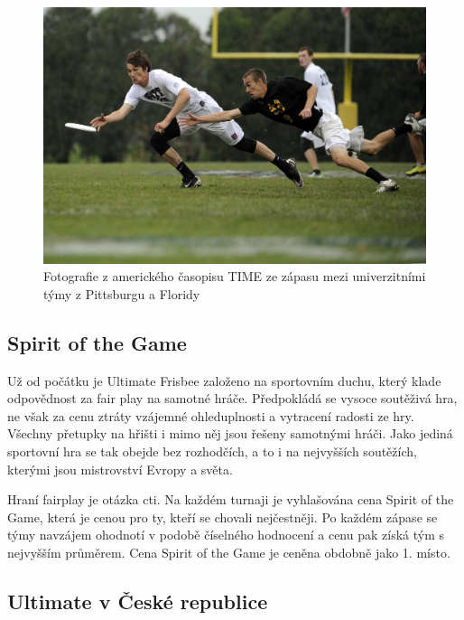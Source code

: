 \begin{figure}[ht!]
\centering
\includegraphics[width=130mm]{./images/ultimate-frisbee.jpg}
\caption{Fotografie z amerického časopisu TIME ze zápasu mezi univerzitními týmy z Pittsburgu a Floridy \cite{ultimate-time}\label{overflow}}
\end{figure}


\subsection{Spirit of the Game}

\indent

Už od počátku je Ultimate Frisbee založeno na sportovním duchu, který klade odpovědnost
za fair play na samotné hráče. Předpokládá se vysoce soutěživá hra, ne však za cenu ztráty
vzájemné ohleduplnosti a vytracení radosti ze hry. Všechny přetupky na hřišti i mimo něj jsou
řešeny samotnými hráči. Jako jediná sportovní hra se tak obejde bez rozhodčích, a to i
na nejvyšších soutěžích, kterými jsou mistrovství Evropy a světa.

\medskip

Hraní fairplay je otázka cti. Na každém turnaji je vyhlašována cena Spirit of the Game,
která je cenou pro ty, kteří se chovali nejčestněji. Po každém zápase se týmy navzájem ohodnotí
v podobě číselného hodnocení a cenu pak získá tým s nejvyšším průměrem. Cena Spirit of the Game
je ceněna obdobně jako 1. místo.

\subsection{Ultimate v České republice}

\indent


